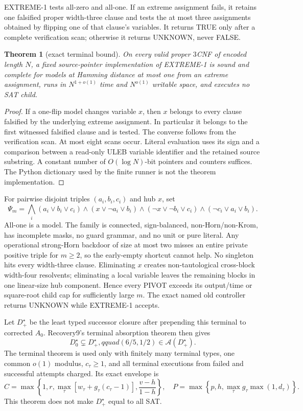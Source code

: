 \documentclass[11pt]{article}
\newtheorem{theorem}{Theorem}
\newcommand{\A}{\mathcal A}
\begin{document}
\textsc{EXTREME-1} tests all-zero and all-one.  If an extreme assignment
fails, it retains one falsified proper width-three clause and tests the at
most three assignments obtained by flipping one of that clause's variables.
It returns TRUE only after a complete verification scan; otherwise it returns
UNKNOWN, never FALSE.

\begin{theorem}[exact terminal bound]
On every valid proper $3$CNF of encoded length $N$, a fixed source-pointer
implementation of \textsc{EXTREME-1} is sound and complete for models at
Hamming distance at most one from an extreme assignment, runs in
$N^{1+o(1)}$ time and $N^{o(1)}$ writable space, and executes no SAT child.
\end{theorem}
\begin{proof}
If a one-flip model changes variable $x$, then $x$ belongs to every clause
falsified by the underlying extreme assignment.  In particular it belongs to
the first witnessed falsified clause and is tested.  The converse follows
from the verification scan.  At most eight scans occur.  Literal evaluation
uses its sign and a comparison between a read-only ULEB variable identifier
and the retained source substring.  A constant number of
$O(\log N)$-bit pointers and counters suffices.  The Python dictionary used
by the finite runner is not the theorem implementation.
\end{proof}

For pairwise disjoint triples $(a_i,b_i,c_i)$ and hub $x$, set
\[
\Psi_m=\bigwedge_i(a_i\vee b_i\vee c_i)
\wedge(x\vee\neg a_i\vee b_i)
\wedge(\neg x\vee\neg b_i\vee c_i)
\wedge(\neg c_i\vee a_i\vee b_i).
\]
All-one is a model.  The family is connected, sign-balanced,
non-Horn/non-Krom, has incomplete masks, no guard grammar, and no unit or
pure literal.  Any operational strong-Horn backdoor of size at most two
misses an entire private positive triple for $m\ge2$, so the early-empty
shortcut cannot help.  No singleton hits every width-three clause.
Eliminating $x$ creates non-tautological cross-block width-four resolvents;
eliminating a local variable leaves the remaining blocks in one linear-size
hub component.  Hence every PIVOT exceeds its output/time or square-root
child cap for sufficiently large $m$.  The exact named old controller
returns UNKNOWN while \textsc{EXTREME-1} accepts.

Let $D_+^\star$ be the least typed successor closure after prepending this
terminal to corrected $A_0$.  Recovery9's terminal absorption theorem then
gives
\[
D_0^\star\subsetneq D_+^\star,qquad
(6/5,1/2)\in\A(D_+^\star).
\]
The terminal theorem is used only with finitely many terminal types, one
common $o(1)$ modulus, $c_\tau\ge1$, and all terminal executions from failed
and successful attempts charged.  Its exact envelope is
\[
C=\max\!\left\{1,r,\max_\tau[w_\tau+g_\tau(c_\tau-1)],
                    \frac{v-h}{1-h}\right\},
\quad
P=\max\!\left\{p,h,\max_\tau g_\tau\max(1,d_\tau)\right\}.
\]
This theorem does not make $D_+^\star$ equal to all SAT.
\end{document}
